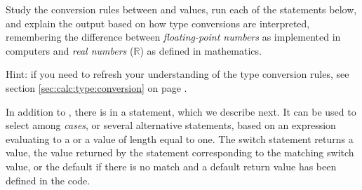 \documentclass[krantz2]{krantz}\usepackage{knitr}
\begin{document}
\begin{playground}
Study the conversion rules between  and  values, run each of the statements below, and explain the output based on how type conversions are interpreted, remembering the difference between \emph{floating-point numbers} as implemented in computers and \emph{real numbers} ($\mathbb{R}$) as defined in mathematics.

\begin{knitrout}\footnotesize
{}\color{fgcolor}\begin{kframe}
\begin{alltt}
 \hlstd{(}\hlstd{)} \hlstd{(}\hlstd{)}
 \hlstd{(}\hlopt{-}\hlstd{)} \hlstd{(}\hlstd{)}
 \hlstd{(}\hlstd{)} \hlstd{(}\hlstd{)}
 \hlstd{(}\hlstd{)} \hlstd{(}\hlstd{)}
 \hlstd{(}\hlstd{)} \hlstd{(}\hlstd{)}
 \hlstd{(}\hlstd{)} \hlstd{(}\hlstd{)}
 \hlstd{(}\hlstd{)} \hlstd{(}\hlstd{)}
 \hlstd{(}\hlstd{(}\hlstd{))} \hlstd{(}\hlstd{)}
 \hlstd{(}\hlstd{(}\hlstd{(}\hlstd{)))} \hlstd{(}\hlstd{)}
 \hlstd{(}\hlstd{(}\hlstd{))} \hlstd{(}\hlstd{)}
 \hlstd{(}\hlstd{)} \hlstd{(}\hlstd{)}
\end{alltt}
\end{kframe}
\end{knitrout}

Hint: if you need to refresh your understanding of the type conversion rules, see section \ref{sec:calc:type:conversion} on page \pageref{sec:calc:type:conversion}.
\end{playground}

In addition to , there is in \Rlang a  statement, which we describe next. It can be used to select among \emph{cases}, or several alternative statements, based on an expression evaluating to a  or a  value of length equal to one. The switch statement returns a value, the value returned by the statement corresponding to the matching switch value, or the default if there is no match and a default return value has been defined in the code.
\end{document}
